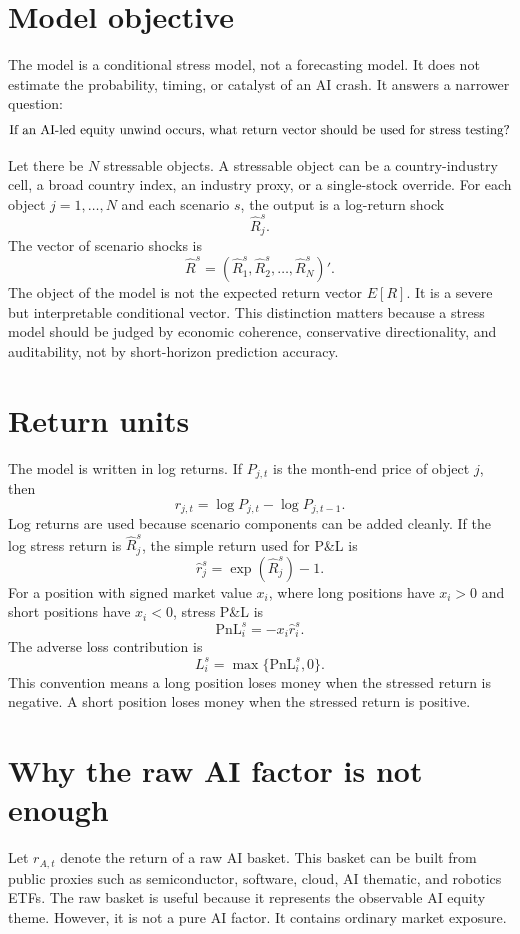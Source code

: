 \documentclass[11pt]{article}
\begin{document}
\tableofcontents

\section{Model objective}

The model is a conditional stress model, not a forecasting model. It does not estimate the probability, timing, or catalyst of an AI crash. It answers a narrower question:
\[
\hbox{If an AI-led equity unwind occurs, what return vector should be used for stress testing?}
\]

Let there be $N$ stressable objects. A stressable object can be a country-industry cell, a broad country index, an industry proxy, or a single-stock override. For each object $j=1,\ldots,N$ and each scenario $s$, the output is a log-return shock
\[
\widehat R_j^s.
\]
The vector of scenario shocks is
\[
\widehat R^s = (\widehat R_1^s,\widehat R_2^s,\ldots,\widehat R_N^s)'.
\]
The object of the model is not the expected return vector $E[R]$. It is a severe but interpretable conditional vector. This distinction matters because a stress model should be judged by economic coherence, conservative directionality, and auditability, not by short-horizon prediction accuracy.

\section{Return units}

The model is written in log returns. If $P_{j,t}$ is the month-end price of object $j$, then
\[
r_{j,t}=\log P_{j,t}-\log P_{j,t-1}.
\]
Log returns are used because scenario components can be added cleanly. If the log stress return is $\widehat R_j^s$, the simple return used for P\&L is
\[
\widehat r_j^s=\exp(\widehat R_j^s)-1.
\]
For a position with signed market value $x_i$, where long positions have $x_i>0$ and short positions have $x_i<0$, stress P\&L is
\[
\mathrm{PnL}_i^s=-x_i\widehat r_i^s.
\]
The adverse loss contribution is
\[
L_i^s=\max\{\mathrm{PnL}_i^s,0\}.
\]
This convention means a long position loses money when the stressed return is negative. A short position loses money when the stressed return is positive.

\section{Why the raw AI factor is not enough}

Let $r_{A,t}$ denote the return of a raw AI basket. This basket can be built from public proxies such as semiconductor, software, cloud, AI thematic, and robotics ETFs. The raw basket is useful because it represents the observable AI equity theme. However, it is not a pure AI factor. It contains ordinary market exposure.
\end{document}
